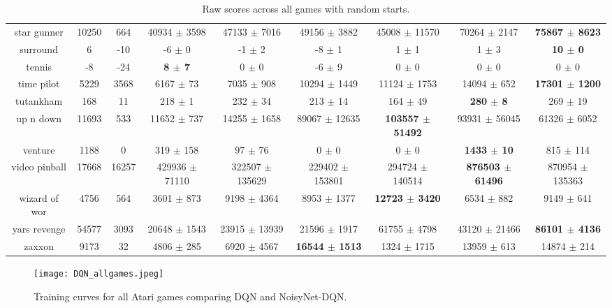 \documentclass{article}
\newcommand{\algoinit}{NoisyNet}
\begin{document}
\begin{table}[!ht]
\begin{tabular}{|c|c|c|c|c|c|c|c|c|}
 star gunner & 10250 & 664 & 40934 $\pm$ 3598 & 47133 $\pm$ 7016 & 49156 $\pm$ 3882 & 45008 $\pm$ 11570 & 70264 $\pm$ 2147 & \bf{75867 $\pm$ 8623} \\
 surround & 6 & -10 & -6 $\pm$ 0 & -1 $\pm$ 2 & -8 $\pm$ 1 & 1 $\pm$ 1 & 1 $\pm$ 3 & \bf{10 $\pm$ 0} \\
 tennis & -8 & -24 & \bf{8 $\pm$ 7} & 0 $\pm$ 0 & -6 $\pm$ 9 & 0 $\pm$ 0 & 0 $\pm$ 0 & 0 $\pm$ 0 \\
 time pilot & 5229 & 3568 & 6167 $\pm$ 73 & 7035 $\pm$ 908 & 10294 $\pm$ 1449 & 11124 $\pm$ 1753 & 14094 $\pm$ 652 & \bf{17301 $\pm$ 1200} \\
 tutankham & 168 & 11 & 218 $\pm$ 1 & 232 $\pm$ 34 & 213 $\pm$ 14 & 164 $\pm$ 49 & \bf{280 $\pm$ 8} & 269 $\pm$ 19 \\
 up n down & 11693 & 533 & 11652 $\pm$ 737 & 14255 $\pm$ 1658 & 89067 $\pm$ 12635 & \bf{103557 $\pm$ 51492} & 93931 $\pm$ 56045 & 61326 $\pm$ 6052 \\
 venture & 1188 & 0 & 319 $\pm$ 158 & 97 $\pm$ 76 & 0 $\pm$ 0 & 0 $\pm$ 0 & \bf{1433 $\pm$ 10} & 815 $\pm$ 114 \\
 video pinball & 17668 & 16257 & 429936 $\pm$ 71110 & 322507 $\pm$ 135629 & 229402 $\pm$ 153801 & 294724 $\pm$ 140514 & \bf{876503 $\pm$ 61496} & 870954 $\pm$ 135363 \\
 wizard of wor & 4756 & 564 & 3601 $\pm$ 873 & 9198 $\pm$ 4364 & 8953 $\pm$ 1377 & \bf{12723 $\pm$ 3420} & 6534 $\pm$ 882 & 9149 $\pm$ 641 \\
 yars revenge & 54577 & 3093 & 20648 $\pm$ 1543 & 23915 $\pm$ 13939 & 21596 $\pm$ 1917 & 61755 $\pm$ 4798 & 43120 $\pm$ 21466 & \bf{86101 $\pm$ 4136} \\
 zaxxon & 9173 & 32 & 4806 $\pm$ 285 & 6920 $\pm$ 4567 & \bf{16544 $\pm$ 1513} & 1324 $\pm$ 1715 & 13959 $\pm$ 613 & 14874 $\pm$ 214 \\
\hline
\end{tabular}
\caption{Raw scores across all games with random starts.}
\label{tl:raw.score}
\end{table}

\newpage


\begin{figure}[!ht]
\begin{centering}
    \texttt{[image: DQN\_allgames.jpeg]}
    \caption{Training curves for all Atari games comparing DQN and \algoinit{}-DQN.}
    \label{fig:all_games_dqn}    
    \end{centering}
\end{figure}
\end{document}
